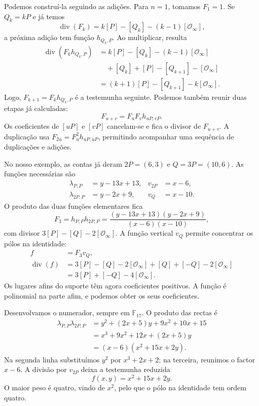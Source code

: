 Podemos construí-la seguindo as adições. Para \(n=1\), tomamos
\(F_1=1\). Se \(Q_k=kP\) e já temos
\[
 \operatorname{div}(F_k)=k[P]-[Q_k]-(k-1)[\mathcal O_\infty],
\]
a próxima adição tem função \(h_{Q_k,P}\). Ao multiplicar, resulta
\begin{align*}
 \operatorname{div}(F_kh_{Q_k,P})
 &=k[P]-[Q_k]-(k-1)[\mathcal O_\infty]\\
 &\quad+[Q_k]+[P]-[Q_{k+1}]-[\mathcal O_\infty]\\
 &=(k+1)[P]-[Q_{k+1}]-k[\mathcal O_\infty].
\end{align*}
Logo, \(F_{k+1}=F_kh_{Q_k,P}\) é a testemunha seguinte. Podemos
também reunir duas etapas já calculadas:
\[
 F_{u+v}=F_uF_vh_{uP,vP}.
\]
Os coeficientes de \([uP]\) e \([vP]\) cancelam-se e fica o
divisor de \(F_{u+v}\). A duplicação usa \(F_{2u}=F_u^2h_{uP,uP}\),
permitindo acompanhar uma sequência de duplicações e adições.

No nosso exemplo, as contas já deram \(2P=(6,3)\) e
\(Q=3P=(10,6)\). As funções necessárias são
\begin{align*}
 \lambda_{P,P}&=y-13x+13,&v_{2P}&=x-6,\\
 \lambda_{2P,P}&=y-2x+9,&v_Q&=x-10.
\end{align*}
O produto das duas funções elementares fica
\[
 F_3=h_{P,P}h_{2P,P}
 =\frac{(y-13x+13)(y-2x+9)}{(x-6)(x-10)},
\]
com divisor \(3[P]-[Q]-2[\mathcal O_\infty]\). A função
vertical \(v_Q\) permite concentrar os pólos na identidade:
\begin{align*}
 f&=F_3v_Q,\\
 \operatorname{div}(f)
 &=3[P]-[Q]-2[\mathcal O_\infty]
   +[Q]+[-Q]-2[\mathcal O_\infty]\\
 &=3[P]+[-Q]-4[\mathcal O_\infty].
\end{align*}
Os lugares afins do suporte têm agora coeficientes positivos. A função é
polinomial na parte afim, e podemos obter os seus coeficientes.

Desenvolvamos o numerador, sempre em \(\mathbb F_{17}\). O produto
das rectas é
\begin{align*}
 \lambda_{P,P}\lambda_{2P,P}
 &=y^2+(2x+5)y+9x^2+10x+15\\
 &=x^3+9x^2+12x+(2x+5)y\\
 &=(x-6)(x^2+15x+2y).
\end{align*}
Na segunda linha substituímos \(y^2\) por \(x^3+2x+2\);
na terceira, reunimos o factor \(x-6\). A divisão por \(v_{2P}\)
deixa a testemunha reduzida
\begin{equation}
 f(x,y)=x^2+15x+2y.
 \label{eq:divisors-example-witness}
\end{equation}
O maior peso é quatro, vindo de \(x^2\), pelo que o pólo na
identidade tem ordem quatro.

